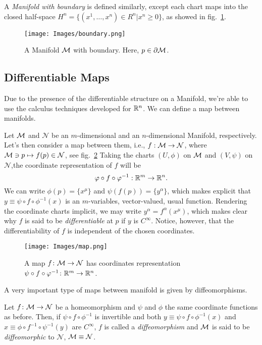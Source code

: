 A \emph{Manifold with boundary} is defined similarly, except each chart maps into the closed half-space $H^n = \{ (x^1, \dots, x^n) \in R^n | x^n \geq 0 \}$, as showed in fig.~\ref{fig:boundary}.

\begin{figure}
    \centering
    \texttt{[image: Images/boundary.png]}
    \caption{A Manifold $\mathcal{M}$ with boundary. Here, $p \in \partial \mathcal{M}$.}
    \label{fig:boundary}
\end{figure}

\subsection{Differentiable Maps}
Due to the presence of the differentiable structure on a Manifold, we're able to use the calculus techniques developed for $\mathbb{R}^n$. We can define a map between manifolds.

Let $\mathcal{M}$ and $\mathcal{N}$  be an $m$-dimensional and an $n$-dimensional Manifold, respectively. Let's then consider a map between them, i.e., $f: \mathcal{M} \to \mathcal{N}$, where $\mathcal{M} \ni p \mapsto f(p) \in \mathcal{N}$, see fig.~\ref{fig:map} Taking the charts $(U, \phi)$ on $\mathcal{M}$ and $(V,\psi)$ on $\mathcal{N}$,the coordinate representation of $f$ will be
\begin{equation}
    \varphi \circ f \circ \varphi^{-1}: \mathbb{R}^m \to \mathbb{R}^n .
\end{equation}
We can write $\phi(p) = \{x^\mu\}$ and $\psi(f(p)) = \{y^\alpha\}$, which makes explicit that $y \equiv \psi \circ f \circ \phi^{-1}(x)$ is an $m$-variables, vector-valued, usual function. Rendering the coordinate charts implicit, we may write $y^\alpha = f^\alpha(x^\mu)$, which makes clear why $f$ is said to be \emph{differentiable} at $p$ if $y$ is $C^\infty$. Notice, however, that the differentiability of $f$ is independent of the chosen coordinates.

\begin{figure}
    \centering
    \texttt{[image: Images/map.png]}
    \caption{A map $f \colon \mathcal{M} \to \mathcal{N}$ has coordinates representation $\psi \circ f \circ \varphi^{-1} \colon \mathbb{R}^m \to \mathbb{R}^n$.}
    \label{fig:map}
\end{figure}

A very important type of maps between manifold is given by diffeomorphisms.
\begin{definition}[Diffeomorphism]
    Let $f \colon \mathcal{M} \to \mathcal{N}$ be a homeomorphism and $\psi$ and $\phi$ the same coordinate functions as before. Then, if $\psi \circ f \circ \phi^{-1}$ is invertible and both $y \equiv \psi \circ f \circ \phi^{-1}(x)$ and $x \equiv \phi \circ f^{-1} \circ \psi^{-1}(y)$ are $C^\infty$, $f$ is called a \emph{diffeomorphism} and $\mathcal{M}$ is said to be \emph{diffeomorphic} to $\mathcal{N}$, $\mathcal{M} \equiv \mathcal{N}$.
\end{definition}


